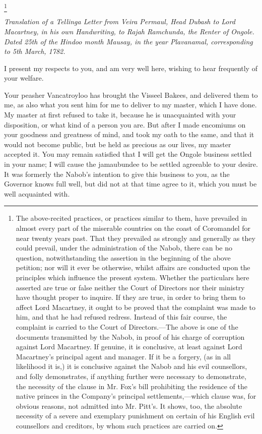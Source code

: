 \footnote{ The above-recited practices, or practices similar to them, have prevailed in almost every part of the miserable countries on the coast of Coromandel for near twenty years past. That they prevailed as strongly and generally as they could prevail, under the administration of the Nabob, there can be no question, notwithstanding the assertion in the beginning of the above petition; nor will it ever be otherwise, whilst affairs are conducted upon the principles which influence the present system. Whether the particulars here asserted are true or false neither the Court of Directors nor their ministry have thought proper to inquire. If they are true, in order to bring them to affect Lord Macartney, it ought to be proved that the complaint was made to him, and that he had refused redress. Instead of this fair course, the complaint is carried to the Court of Directors.—The above is one of the documents transmitted by the Nabob, in proof of his charge of corruption against Lord Macartney. If genuine, it is conclusive, at least against Lord Macartney's principal agent and manager. If it be a forgery, (as in all likelihood it is,) it is conclusive against the Nabob and his evil counsellors, and folly demonstrates, if anything further were necessary to demonstrate, the necessity of the clause in Mr. Fox's bill prohibiting the residence of the native princes in the Company's principal settlements,—which clause was, for obvious reasons, not admitted into Mr. Pitt's. It shows, too, the absolute necessity of a severe and exemplary punishment on certain of his English evil counsellors and creditors, by whom such practices are carried on.}


\PRLsep

\textit{Translation of a Tellinga Letter from Veira Permaul, Head Dubash to Lord Macartney, in his own Handwriting, to Rajah Ramchunda, the Renter of Ongole. Dated 25th of the Hindoo month Mausay, in the year Plavanamal, corresponding to 5th March, 1782.}
\vspace{0.3cm}

I present my respects to you, and am very well here, wishing to hear frequently of your welfare.

Your peasher Vancatroyloo has brought the Visseel Bakees, and delivered them to me, as also what you sent him for me to deliver to my master, which I have done. My master at first refused to take it, because he is unacquainted with your disposition, or what kind of a person you are. But after I made encomiums on your goodness and greatness of mind, and took my oath to the same, and that it would not become public, but be held as precious as our lives, my master accepted it. You may remain satisfied that I will get the Ongole business settled in your name; I will cause the jamaubundee to be settled agreeable to your desire. It was formerly the Nabob's intention to give this business to you, as the Governor knows full well, but did not at that time agree to it, which you must be well acquainted with.

